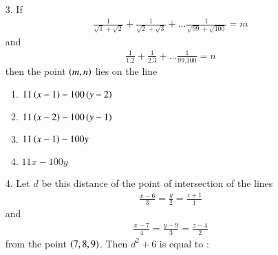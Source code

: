 \documentclass[journal,12pt,onecolumn]{IEEEtran}
\theoremstyle{remark}
\begin{document}
\begin{enumerate}
\item[3.] If
	\begin{align}
        \frac{1}{\sqrt{1} + \sqrt{2}} + \frac{1}{\sqrt{2} + \sqrt{3}} + \dots \frac{1}{\sqrt{99} + \sqrt{100}} = m
	\end{align} and
    \begin{align}
        \frac{1}{1 . 2} + \frac{1}{2 . 3} + \dots \frac{1}{99 . 100} = n
    \end{align} then the point $\left(m, n\right)$ lies on the line
		\hfill{}
		\begin{enumerate}
            \item $11\left(x-1\right) - 100\left(y-2\right)$ 
            \item $11\left(x-2\right) - 100\left(y-1\right)$ 
            \item $11\left(x-1\right) - 100y$ 
            \item $11x - 100y$ 
		\end{enumerate}
		
	\item[4.] Let $d$ be this distance of the point of intersection of the lines
        \begin{align}
            \frac{x-6}{3} = \frac{y}{2} = \frac{z+1}{1} 
        \end{align} and 
        \begin{align}
            \frac{x-7}{4} = \frac{y-9}{3} = \frac{z-4}{2}
        \end{align} from the point $\left(7, 8, 9\right)$. Then $d^2 + 6$ is equal to :
        \hfill{}
		\begin{enumerate}
		\end{enumerate}


\end{enumerate}
\end{document}
